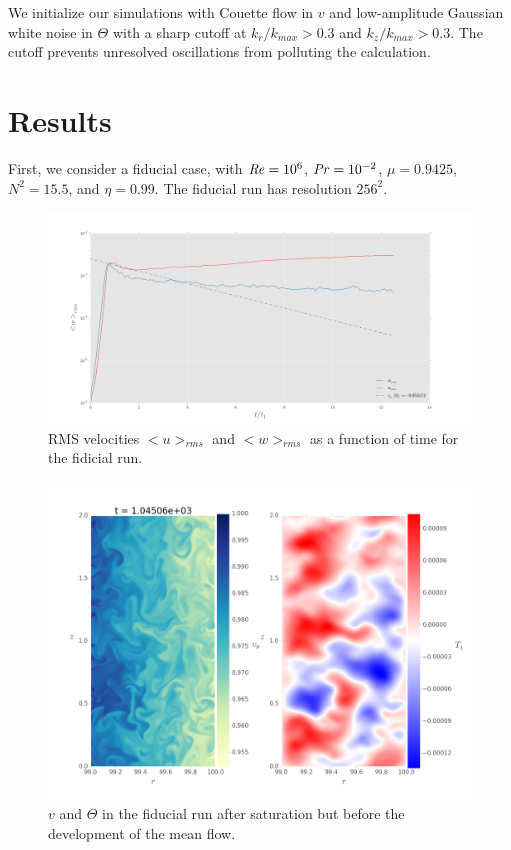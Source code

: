 \documentclass{jfm}
\begin{document}
We initialize our simulations with Couette flow in $v$ and
low-amplitude Gaussian white noise in $\Theta$ with a sharp cutoff at
$k_r/k_{max} > 0.3$ and $k_z/k_{max} > 0.3$. The cutoff prevents
unresolved oscillations from polluting the calculation.

\section{Results}
\label{sec:results}

First, we consider a fiducial case, with $\mbox{\textit{Re}} = 10^6$,
$\mbox{\textit{Pr}} = 10^{-2}$, $\mu = 0.9425$, $N^2 = 15.5$, and $\eta = 0.99$. The
fiducial run has resolution $256^2$. 

\begin{figure}
  \centering
  \includegraphics[width=\textwidth]{../../figs/rms_vel_re1.00e+06_mu9.43e-01_eta9.90e-01_Pr1.00e-02_N21.55e+01_nz256.png}
  \caption{RMS velocities $<u>_{rms}$ and $<w>_{rms}$ as a function of time for the fidicial run. }
  \label{fig:fid_energies}
\end{figure}

\begin{figure}
  \centering
  \includegraphics[width=\textwidth]{../../figs/vel_frame_0155_re1.00e+06_mu9.43e-01_eta9.90e-01_Pr1.00e-02_N21.55e+01_nz256.png}
  \caption{$v$ and $\Theta$ in the fiducial run after saturation but before the development of the mean flow.}
  \label{fig:fiducial_slice_early}
\end{figure}
\end{document}
